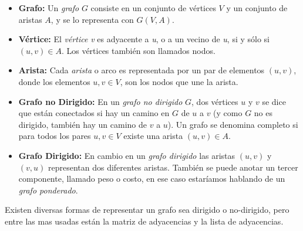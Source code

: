       \begin{itemize}
        \item \textbf{Grafo:} Un \emph{grafo} $G$ consiste en un conjunto de vértices $V$ y un conjunto de aristas $A$, y se lo representa con $G(V,A)$.

        \item  \textbf{Vértice:} El \emph{vértice} \emph{v} es adyacente a \emph{u}, o a un vecino de \emph{u}, si y sólo si $(u,v) \in A$. Los vértices también son llamados nodos.

        \item  \textbf{Arista:}
        Cada \emph{arista} o arco es representada por un par de elementos $(u,v)$, donde los elementos $u,v \in V$, son los nodos que une la arista.


        \item \textbf{Grafo no Dirigido:}
        En un \emph{grafo no dirigido} $G$, dos vértices $u$ y $v$ se dice que están conectados si hay un camino en $G$ de $u$ a $v$ (y como $G$ no es dirigido, también hay un camino de $v$ a $u$). Un grafo  se denomina completo si para todos los pares $u,v \in V$ existe una arista $(u,v) \in A$.


        \item \textbf{Grafo Dirigido:} En cambio en un \emph{grafo dirigido} las aristas $(u,v)$ y $(v,u)$ representan dos diferentes aristas. También se puede anotar un tercer componente, llamado peso o costo, en ese caso estaríamos hablando de un \emph{grafo ponderado}.

      \end{itemize}



      Existen diversas formas de representar un grafo sea dirigido o no-dirigido, pero entre las mas usadas están la matriz de adyacencias y la lista de adyacencias.

